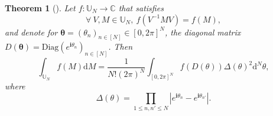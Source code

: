 \documentclass[twoside,11pt]{book}
\newtheorem{theorem}{Theorem}
\numberwithin{theorem}{chapter}
\numberwithin{definition}{chapter}
\numberwithin{proposition}{chapter}
\numberwithin{corollary}{chapter}
\numberwithin{example}{chapter}
\numberwithin{lemma}{chapter}
\numberwithin{assumption}{chapter}
\numberwithin{equation}{chapter}
\numberwithin{figure}{chapter}
\begin{document}
\begin{theorem}[\cite{Wey46}]
Let $f: \mathbb{U}_{N} \rightarrow \mathbb{C}$ that satisfies
\begin{equation}\label{eq:weil_condition}
\forall \: V, M \in \mathbb{U}_{N}, \:  f(V^{-1}M V) = f(M),
\end{equation}
and denote for $\bm{\theta} = (\theta_{n})_{n \in [N]} \in [0,2\pi]^{N}$, the diagonal matrix $D(\bm{\theta}) = \mathrm{Diag}(e^{\mathbf{i} \theta_{n}})_{n \in [N]}$.
Then
\begin{equation}\label{eq:weyl_integration_formula}
\int_{\mathbb{U}_{N}}f(M) \mathrm{d}M = \frac{1}{N!(2 \pi)^{N}} \int_{[0,2\pi]^{N}} f(D(\theta)) \Delta(\theta)^{2} \mathrm{d}^{N}\theta,
\end{equation}
where 
\begin{equation}
\Delta(\theta) = \prod\limits_{1 \leq n,n' \leq N} | e^{\mathbf{i} \theta_{n}} -e^{\mathbf{i} \theta_{n'}} |.
\end{equation}
\end{theorem}
\end{document}
